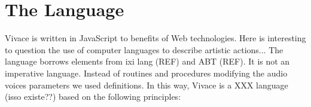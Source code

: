 \documentclass[letterpaper, 12pt]{article}
\begin{document}
\section{The Language}
Vivace is written in JavaScript to benefits of Web technologies. Here is interesting to question the use of computer languages to describe artistic actions...
%
%
%
%
The language borrows elements from ixi lang (REF) and ABT (REF). It is not an imperative language. Instead of routines and procedures modifying the audio voices parameters we used definitions. In this way, Vivace is a XXX language (isso existe??) based on the following principles:
\end{document}
